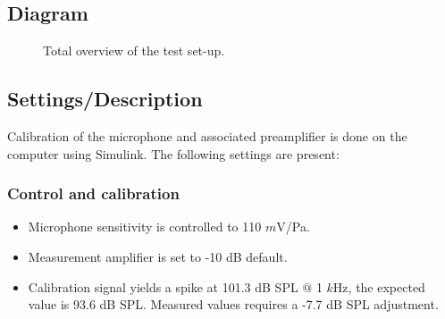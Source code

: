 \subsection{Diagram}


\begin{figure}[H]
	\centering
	
	\caption{Total overview of the test set-up.}
	\label{SchematicOverviewHP}
\end{figure}
\subsection{Settings/Description}
\label{SettingsHeadPhones}
Calibration of the microphone and associated preamplifier is done on the computer using Simulink. The following settings are present:

\subsubsection{Control and calibration}
\begin{itemize}
	\item Microphone sensitivity is controlled to 110 $m$V/Pa.
	\item Measurement amplifier is set to -10 dB default.
	\item Calibration signal yields a spike at 101.3 dB SPL $@$ 1 $k$Hz, the expected value is 93.6 dB SPL. Measured values requires a -7.7 dB SPL adjustment.
\end{itemize}
